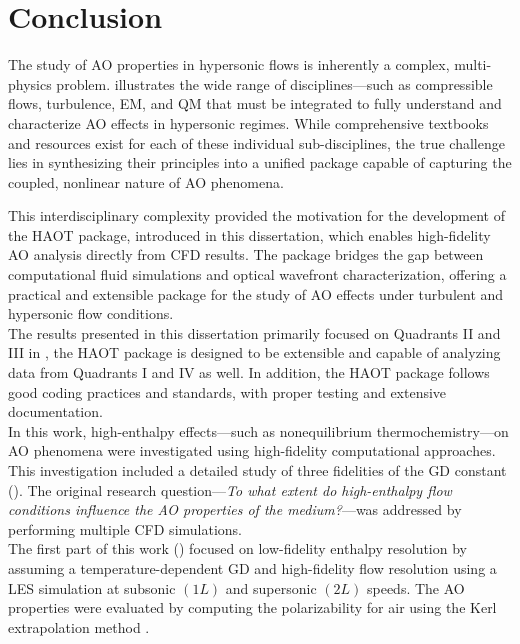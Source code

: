 \chapter{Conclusion\label{ch:ch5}}
The study of \gls{AO} properties in hypersonic flows is inherently a complex, multi-physics problem.
 illustrates the wide range of disciplines—such as
compressible flows, turbulence, \gls{EM}, and \gls{QM} that must be
integrated to fully understand and characterize \gls{AO} effects in
hypersonic regimes. While comprehensive textbooks and resources exist for each
of these individual sub-disciplines, the true challenge lies in synthesizing
their principles into a unified package capable of capturing the coupled,
nonlinear nature of \gls{AO} phenomena.


This interdisciplinary complexity provided the motivation for the development
of the \gls{HAOT} package, introduced in this dissertation, which enables
high-fidelity \gls{AO} analysis directly from \gls{CFD} results. The package
bridges the gap between computational fluid simulations and optical wavefront
characterization, offering a practical and extensible package for the study of
\gls{AO} effects under turbulent and hypersonic flow conditions. \\

The results presented in this dissertation primarily focused on
Quadrants II and III in , the \gls{HAOT}
package is designed to be extensible and capable of analyzing data from
Quadrants I and IV as well. In addition, the \gls{HAOT} package follows good
coding practices and standards, with proper testing and extensive
documentation. \\

In this work, high-enthalpy effects—such as nonequilibrium thermochemistry—on
\gls{AO} phenomena were investigated using high-fidelity computational
approaches. This investigation included a detailed study of three
fidelities of the \gls{GD} constant (). The original
research question—\textit{To what extent do high-enthalpy flow conditions
influence the \gls{AO} properties of the medium?}—was addressed by performing
multiple \gls{CFD} simulations. \\

The first part of this work () focused on low-fidelity
enthalpy resolution by assuming a temperature-dependent \gls{GD} and
high-fidelity flow resolution using a \gls{LES} simulation at subsonic $(1L)$
and supersonic $(2L)$ speeds. The \gls{AO}
properties were evaluated by computing the polarizability for air using the
Kerl extrapolation method \cite{Kerl1992}. \\

